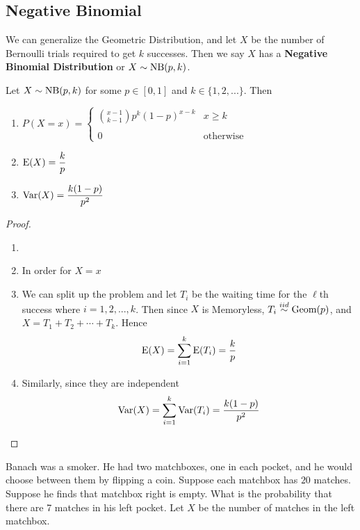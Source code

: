 \documentclass{report}
\begin{document}
\subsection{Negative Binomial}
\newcommand{\nbin}{\textup{NB}}
We can generalize the Geometric Distribution, and let $X$ be the number of Bernoulli trials required to get $k$ successes. Then we say $X$ has a \textbf{Negative Binomial Distribution} or $X\sim \nbin(p,k)$.
\begin{theorem}
    Let $X\sim \nbin(p,k)$ for some $p\in[0,1]$ and $k\in\{1,2,...\}$. Then
    \begin{enumerate}
        \item $P(X=x)=\begin{cases}
                \displaystyle\binom {x-1}{k-1} p^{k}(1-p)^{x-k} & x \ge k\\\\
                0 & \text{otherwise}
            \end{cases}$
        \item $\textup{E}(X)=\displaystyle\frac k p$
        \item $\textup{Var}(X)=\displaystyle\frac{k(1-p)}{p^2}$
    \end{enumerate}

    \begin{proof}
    \begin{enumerate}
        \item[]
        \item In order for $X=x$
        \item We can split up the problem and let $T_i$ be the waiting time for the $\ell$th success where $i=1,2,...,k$. Then since $X$ is Memoryless, $T_i\overset{iid}\sim \text{Geom}(p)$, and $X=T_1+T_2+\cdots + T_k$. Hence
        \[
            \textup{E}(X)=\sum_{i=1}^k \textup{E}(T_i)=\frac k p
        \]
        \item Similarly, since they are independent
        \[
            \textup{Var}(X)=\sum_{i=1}^k \textup{Var}(T_i)=\frac{k(1-p)}{p^2}
        \]
    \end{enumerate}
    \end{proof}
\end{theorem}

Banach was a smoker. He had two matchboxes, one in each pocket, and he would choose between them by flipping a coin. 
Suppose each matchbox has $20$ matches. Suppose he finds that matchbox right is empty. What is the probability that there are 7 matches in his left pocket. Let $X$ be the number of matches in the left matchbox. 
\end{document}
